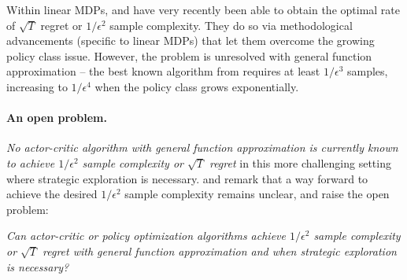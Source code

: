 Within linear MDPs, \citet{sherman2023rate} and \citet{cassel2024warm} have very recently been able to obtain the optimal rate of $\sqrt{T}$ regret or $1/\epsilon^2$ sample complexity. They do so via methodological advancements (specific to linear MDPs) that let them overcome the growing policy class issue.
However, the problem is unresolved with general function approximation -- the best known algorithm from \citet{liu2023optimistic} requires at least $1/\epsilon^3$ samples, increasing to $1/\epsilon^4$ when the policy class grows exponentially.



\paragraph{An open problem.} \textit{No actor-critic algorithm with general function approximation is currently known to achieve $1/\epsilon^2$ sample complexity or $\sqrt{T}$ regret} in this more challenging setting where strategic exploration is necessary. \citet{zhong2023theoretical} and \citet{liu2023optimistic} remark that  a way forward to achieve the desired $1/\epsilon^2$ sample complexity remains unclear, and raise the open problem:

\begin{center}
    \textit{Can actor-critic or policy optimization algorithms achieve $1/\epsilon^2$ sample complexity or $\sqrt{T}$ regret with general function approximation and when strategic exploration is necessary?}
\end{center}



